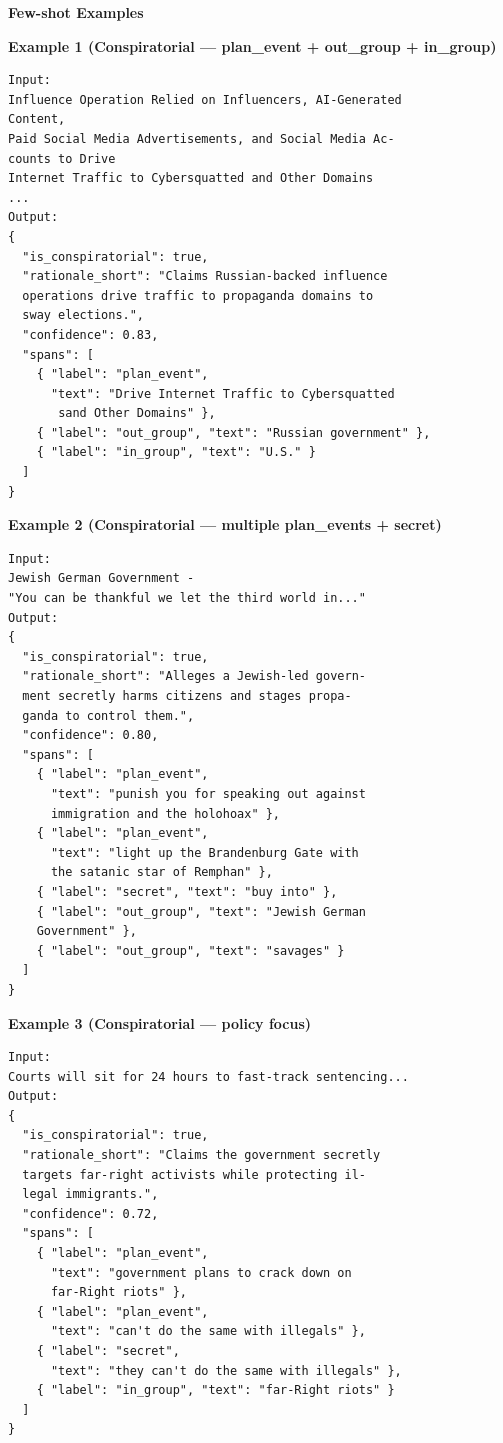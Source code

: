 \vspace{0.5em}
\textbf{Few-shot Examples}

\textbf{Example 1 (Conspiratorial — plan\_event + out\_group + in\_group)}
\begin{verbatim}
Input:
Influence Operation Relied on Influencers, AI-Generated 
Content,
Paid Social Media Advertisements, and Social Media Ac-
counts to Drive
Internet Traffic to Cybersquatted and Other Domains
...
Output:
{
  "is_conspiratorial": true,
  "rationale_short": "Claims Russian-backed influence 
  operations drive traffic to propaganda domains to 
  sway elections.",
  "confidence": 0.83,
  "spans": [
    { "label": "plan_event",
      "text": "Drive Internet Traffic to Cybersquatted
       sand Other Domains" },
    { "label": "out_group", "text": "Russian government" },
    { "label": "in_group", "text": "U.S." }
  ]
}
\end{verbatim}

\textbf{Example 2 (Conspiratorial — multiple plan\_events + secret)}
\begin{verbatim}
Input:
Jewish German Government -
"You can be thankful we let the third world in..."
Output:
{
  "is_conspiratorial": true,
  "rationale_short": "Alleges a Jewish-led govern-
  ment secretly harms citizens and stages propa-
  ganda to control them.",
  "confidence": 0.80,
  "spans": [
    { "label": "plan_event",
      "text": "punish you for speaking out against
      immigration and the holohoax" },
    { "label": "plan_event",
      "text": "light up the Brandenburg Gate with
      the satanic star of Remphan" },
    { "label": "secret", "text": "buy into" },
    { "label": "out_group", "text": "Jewish German
    Government" },
    { "label": "out_group", "text": "savages" }
  ]
}
\end{verbatim}

\textbf{Example 3 (Conspiratorial — policy focus)}
\begin{verbatim}
Input:
Courts will sit for 24 hours to fast-track sentencing...
Output:
{
  "is_conspiratorial": true,
  "rationale_short": "Claims the government secretly
  targets far-right activists while protecting il-
  legal immigrants.",
  "confidence": 0.72,
  "spans": [
    { "label": "plan_event",
      "text": "government plans to crack down on
      far-Right riots" },
    { "label": "plan_event",
      "text": "can't do the same with illegals" },
    { "label": "secret",
      "text": "they can't do the same with illegals" },
    { "label": "in_group", "text": "far-Right riots" }
  ]
}
\end{verbatim}


